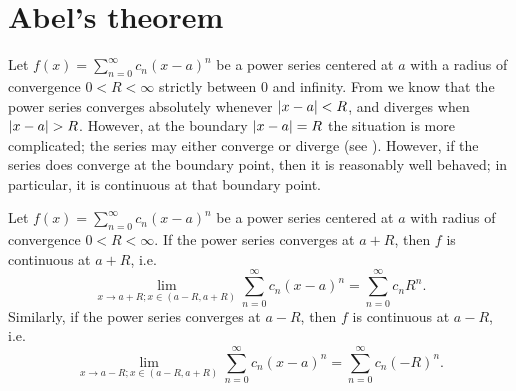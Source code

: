 \section{Abel's theorem}\label{ii:sec:4.3}

\begin{note}
  Let \(f(x) = \sum_{n = 0}^\infty c_n (x - a)^n\) be a power series centered at \(a\) with a radius of convergence \(0 < R < \infty\) strictly between \(0\) and infinity.
  From  we know that the power series converges absolutely whenever \(\left\lvert x - a\right\rvert < R\), and diverges when \(\left\lvert x - a\right\rvert > R\).
  However, at the boundary \(\left\lvert x - a\right\rvert = R\) the situation is more complicated;
  the series may either converge or diverge (see ).
  However, if the series does converge at the boundary point, then it is reasonably well behaved;
  in particular, it is continuous at that boundary point.
\end{note}

\begin{thm}\label{ii:4.3.1}
  Let \(f(x) = \sum_{n = 0}^\infty c_n (x - a)^n\) be a power series centered at \(a\) with radius of convergence \(0 < R < \infty\).
  If the power series converges at \(a + R\), then \(f\) is continuous at \(a + R\), i.e.
  \[
    \lim_{x \to a + R ; x \in (a - R, a + R)} \sum_{n = 0}^\infty c_n (x - a)^n = \sum_{n = 0}^\infty c_n R^n.
  \]
  Similarly, if the power series converges at \(a - R\), then \(f\) is continuous at \(a - R\), i.e.
  \[
    \lim_{x \to a - R ; x \in (a - R, a + R)} \sum_{n = 0}^\infty c_n (x - a)^n = \sum_{n = 0}^\infty c_n (-R)^n.
  \]
\end{thm}

